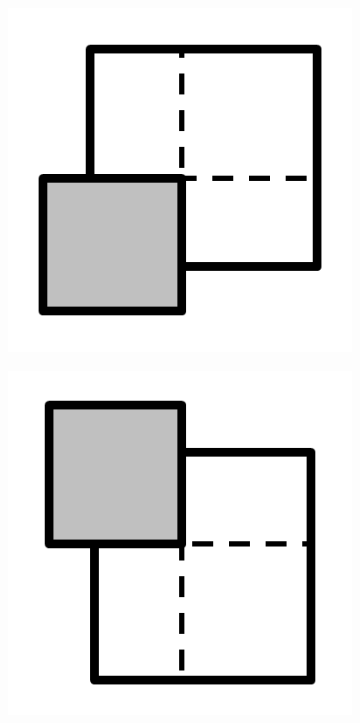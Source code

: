 \documentclass{article}
\begin{document}
\begin{figure}[!h]
\begin{subfigure}{.25\textwidth}
    \caption{}
    \label{fig:c6}
  \end{subfigure}%
  \begin{subfigure}{.25\textwidth}
    \centering
    \includegraphics[width=.95\linewidth]{16cases/c7.png}
    \caption{}
    \label{fig:c7}
  \end{subfigure}%
  \begin{subfigure}{.25\textwidth}
    \centering
    \includegraphics[width=.95\linewidth]{16cases/c8.png}

\end{subfigure}
\end{figure}
\end{document}
